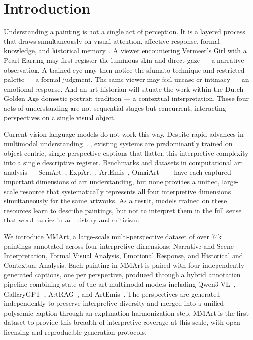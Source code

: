 \section{Introduction}
Understanding a painting is not a single act of perception. It is a layered process that draws simultaneously on visual attention, affective response, formal knowledge, and historical memory~\cite{BMVC_style_2013,panofsky1955meaning, baxandall1988painting}. A viewer encountering Vermeer's Girl with a Pearl Earring may first register the luminous skin and direct gaze — a narrative observation. A trained eye may then notice the sfumato technique and restricted palette — a formal judgment. The same viewer may feel unease or intimacy — an emotional response. And an art historian will situate the work within the Dutch Golden Age domestic portrait tradition — a contextual interpretation. These four acts of understanding are not sequential stages but concurrent, interacting perspectives on a single visual object.

Current vision-language models do not work this way. Despite rapid advances in multimodal understanding~\cite{NEURIPS2023_llava, chen2023sharegpt4v, qwen2vl, yu2025crispsam2sam2crossmodalinteraction}. , existing systems are predominantly trained on object-centric, single-perspective captions that flatten this interpretive complexity into a single descriptive register. Benchmarks and datasets in computational art analysis — SemArt~\cite{semart_2018}, ExpArt~\cite{ExpArt_acl2024}, ArtEmis~\cite{achlioptas2021artemis}, OmniArt~\cite{2017omniart} — have each captured important dimensions of art understanding, but none provides a unified, large-scale resource that systematically represents all four interpretive dimensions simultaneously for the same artworks. As a result, models trained on these resources learn to describe paintings, but not to interpret them in the full sense that word carries in art history and criticism.

We introduce MMArt, a large-scale multi-perspective dataset of over 74k paintings annotated across four interpretive dimensions: Narrative and Scene Interpretation, Formal Visual Analysis, Emotional Response, and Historical and Contextual Analysis. Each painting in MMArt is paired with four independently generated captions, one per perspective, produced through a hybrid annotation pipeline combining state-of-the-art multimodal models including Qwen3-VL~\cite{bai2025qwen3vltechnicalreport}, GalleryGPT~\cite{MM24GalleryGPT}, ArtRAG~\cite{ArtRAG_MM2025}, and ArtEmis~\cite{achlioptas2021artemis}. The perspectives are generated independently to preserve interpretive diversity and merged into a unified polysemic caption through an explanation harmonization step. MMArt is the first dataset to provide this breadth of interpretive coverage at this scale, with open licensing and reproducible generation protocols.



